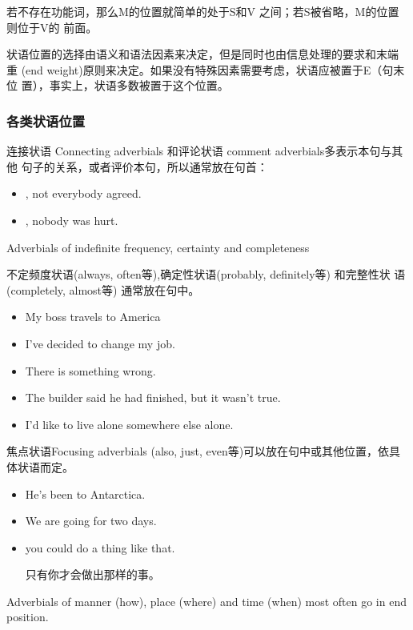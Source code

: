 若不存在功能词，那么M的位置就简单的处于S和V 之间；若S被省略，M的位置则位于V的
前面。

状语位置的选择由语义和语法因素来决定，但是同时也由信息处理的要求和末端
重 (end weight)原则来决定。如果没有特殊因素需要考虑，状语应被置于E（句末位
置），事实上，状语多数被置于这个位置。

\subsubsection{各类状语位置}

连接状语 Connecting adverbials 和评论状语 comment adverbials多表示本句与其他
句子的关系，或者评价本句，所以通常放在句首：
\begin{itemize}
\item {}, not everybody agreed.

\item {}, nobody was hurt.
\end{itemize}

Adverbials of indefinite frequency, certainty and completeness

不定频度状语(always, often等),确定性状语(probably, definitely等) 和完整性状
语 (completely, almost等) 通常放在句中。
\begin{itemize}
\item My boss  travels to America
\item I've  decided to change my job.
\item There is  something wrong.
\item The builder said he had  finished, but it wasn't true.
\item {} I'd like to live alone somewhere else alone.
\end{itemize}

焦点状语Focusing adverbials (also, just, even等)可以放在句中或其他位置，依具
体状语而定。
\begin{itemize}
\item He's  been to Antarctica.

\item We are  going for two days.


\item {} you could do a thing like that.

  只有你才会做出那样的事。
\end{itemize}

Adverbials of manner (how), place (where) and time (when) most often go in end position.

